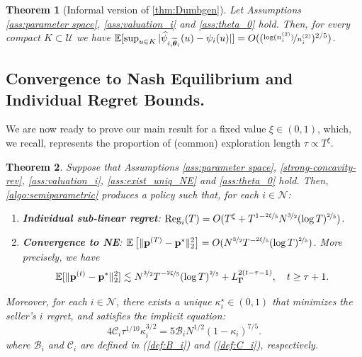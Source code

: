\documentclass{article} %
\def\eqref#1{equation~\ref{#1}}
\renewcommand{\eqref}[1]{(\ref{#1})}
\newtheorem{theorem}{Theorem}[section]
\begin{document}
\begin{theorem}[Informal version of \cref{thm:Dumbgen}]
Let Assumptions \ref{ass:parameter space}, \ref{ass:valuation_i} and \ref{ass:theta_0} hold. Then, for every compact $K \subset \mathcal{U}$ we have 
$\mathbb{E}[\sup_{u \in K} |\widehat \psi_{i,\widetilde{\boldsymbol{\theta}}_i}(u)-\psi_{i}(u)|] = O((\nicefrac{\log (n_i^{(2)})}{n_i^{(2)}})^{2/5})$.
\end{theorem}


\subsection{Convergence to Nash Equilibrium and Individual Regret Bounds.}\label{sec:NE_convergence}
We are now ready to prove our main result for a fixed value $\xi \in (0,1)$, which, we recall, represents the proportion of (common) exploration length $\tau \propto T^{\xi}$.

\begin{theorem}\label{thm:main_convergence}
Suppose that Assumptions \ref{ass:parameter space}, \ref{strong-concavity-rev}, \ref{ass:valuation_i}, \ref{ass:exist_uniq_NE} and \ref{ass:theta_0} hold. Then, \cref{algo:semiparametric} produces a policy such that, for each $i \in \mathcal{N}$:
\begin{enumerate}[leftmargin=*, label=(\arabic*)]
\item {\bf Individual sub-linear regret}: $\operatorname{Reg}_i(T) = O (T^{\xi} + T^{1-\nicefrac{2\xi}{5}}  N ^{\nicefrac{3}{2}}(\log T)^{\nicefrac{2}{5}})$.
\item {\bf Convergence to NE}: $\mathbb{E}\left[\|\mathbf{p}^{(T)}-\mathbf{p}^*\|_2^2\right] = O(N ^{\nicefrac{3}{2}}T ^{-\nicefrac{2\xi}{5}}(\log T)^{\nicefrac{2}{5}})$. More precisely, we have 
\begin{equation}\label{convergence_expected_price}
\mathbb{E}[\|\mathbf{p}^{(t)}-\mathbf{p}^*\|_2^2] \lesssim N ^{\nicefrac{3}{2}}T ^{-\nicefrac{2\xi}{5}}(\log T)^{\nicefrac{2}{5}}+L^{2(t-\tau-1)}_{\boldsymbol{\Gamma}}, \quad t \geq \tau+1.
\end{equation}
\end{enumerate}
Moreover, for each $i \in \mathcal{N}$, there exists a unique $\kappa_i^{\star} \in (0,1)$ that minimizes the seller's $i$ regret, and satisfies the implicit equation:
\begin{equation}\label{eq:optimal_kappa}
4 \mathscr{C}_i\tau^{1/10}\textstyle \kappa_i^{3/2} = 5 \mathscr{B}_i N^{1/2} (1-\kappa_i)^{7/5}.
\end{equation}
where $\mathscr{B}_i$ and $\mathscr{C}_i$ are defined in \eqref{def:B_i} and \eqref{def:C_i}, respectively.
\end{theorem}
\end{document}
